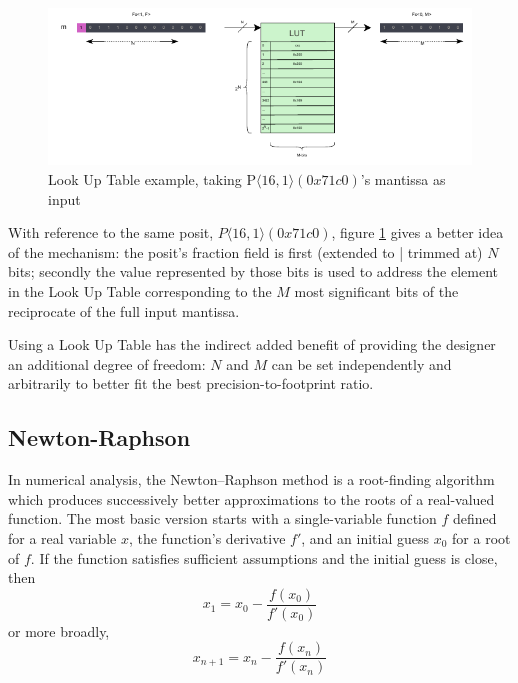 \begin{figure}[h!]
    \begin{center}
    \includegraphics[width=1\textwidth]{figures/lut.drawio.pdf}
    \caption{Look Up Table example, taking P$\langle 16,1 \rangle(0x71c0)$'s mantissa as input}
    \label{fig:lut_drawio_example}
    \end{center}
\end{figure}

With reference to the same posit, $P\langle 16,1 \rangle(0x71c0)$, figure \ref{fig:lut_drawio_example} gives a better idea of the mechanism: the posit's fraction field is first (extended to | trimmed at) $N$ bits; secondly the value represented by those bits is used to address the element in the Look Up Table corresponding to the $M$ most significant bits of the reciprocate of the full input mantissa.

Using a Look Up Table has the indirect added benefit of providing the designer an additional degree of freedom: $N$ and $M$ can be set independently and arbitrarily to better fit the best precision-to-footprint ratio.


\subsection{Newton-Raphson}\label{Newton_Raphson}


In numerical analysis, the Newton–Raphson method is a root-finding algorithm which produces successively better approximations to the roots of a real-valued function. The most basic version starts with a single-variable function $f$ defined for a real variable $x$, the function's derivative $f'$, and an initial guess $x_0$ for a root of $f$.
If the function satisfies sufficient assumptions and the initial guess is close, then
$$
x_{1} = x_0 - \frac{f(x_0)}{f'(x_0)}
$$
or more broadly,
\begin{equation}\label{equ:newon_raphson_generalized_equation}
x_{n+1} = x_n - \frac{f(x_n)}{f'(x_n)}
\end{equation}

